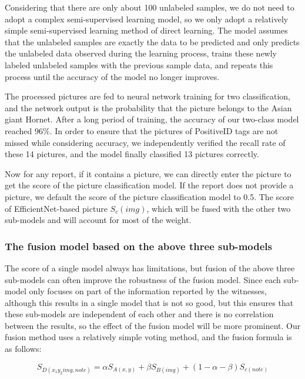 \documentclass{mcmthesis}
\numberwithin{figure}{section}
\numberwithin{table}{section}
\begin{document}
Considering that there are only about 100 unlabeled samples, we do not need to adopt a complex semi-supervised learning model, so we only adopt a relatively simple semi-supervised learning method of direct learning. The model assumes that the unlabeled samples are exactly the data to be predicted and only predicts the unlabeled data observed during the learning process, trains these newly labeled unlabeled samples with the previous sample data, and repeats this process until the accuracy of the model no longer improves.


The processed pictures are fed to neural network training for two classification, and the network output is the probability that the picture belongs to the Asian giant Hornet. After a long period of training, the accuracy of our two-class model reached $96\%$. In order to ensure that the pictures of PositiveID tags are not missed while considering accuracy, we independently verified the recall rate of these 14 pictures, and the model finally classified 13 pictures correctly.

Now for any report, if it contains a picture, we can directly enter the picture to get the score of the picture classification model. If the report does not provide a picture, we default the score of the picture classification model to 0.5. The score of EfficientNet-based picture $S_c(img)$, which will be fused with the other two sub-models and will account for most of the weight.

\subsubsection{The fusion model based on the above three sub-models}

The score of a single model always has limitations, but fusion of the above three sub-models can often improve the robustness of the fusion model. Since each sub-model only focuses on part of the information reported by the witnesses, although this results in a single model that is not so good, but this ensures that these sub-models are independent of each other and there is no correlation between the results, so the effect of the fusion model will be more prominent. Our fusion method uses a relatively simple voting method, and the fusion formula is as follows:

\begin{equation}
  S_{D(x_1 y_2 img,note)} = \alpha S_{A(x,y)}  + \beta S_{B(img)} + (1-\alpha-\beta)S_{c(note)}
\end{equation}
\end{document}
